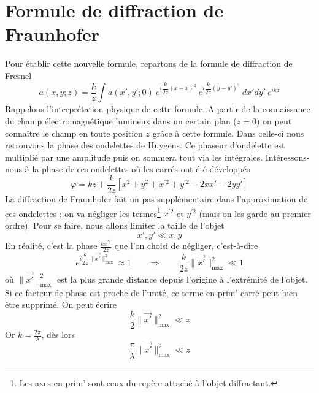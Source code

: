 \section{Formule de diffraction de Fraunhofer}
Pour établir cette nouvelle formule, repartons de la formule de diffraction de Fresnel
\begin{equation}
a(x,y;z) = \frac{k}{z}\int a(x',y';0)\ e^{i\dfrac{k}{2z}(x-x)^2}\
 e^{i\dfrac{k}{2z}(y-y')^2}\ dx'dy'\  e^{ikz}
\end{equation}
Rappelons l'interprétation physique de cette formule.
A partir de la connaissance du champ électromagnétique lumineux dans un certain plan 
($z=0$) on peut connaître le champ en toute position $z$ grâce à cette formule. Dans 
celle-ci nous retrouvons la phase des ondelettes de Huygens. Ce phaseur d'ondelette 
est multiplié par une amplitude puis on sommera tout via les intégrales. Intéressons-
nous à la phase de ces ondelettes où les carrés ont été développés
\begin{equation}
\varphi = kz + \frac{k}{2z}\left[x^2 + y^2 + x^{'2} + y^{'2} - 2xx'-2yy'\right]
\end{equation}
La diffraction de Fraunhofer fait un pas supplémentaire dans l'approximation de ces 
ondelettes : on va négliger les termes\footnote{Les axes en prim' sont ceux du repère 
attaché à l'objet diffractant.} $x^{'2}$ et $y^{'2}$ (mais on les garde au premier 
ordre). Pour se faire, nous allons limiter la taille de l'objet
\begin{equation}
x',y' \ll x,y
\end{equation}
En réalité, c'est la phase $\frac{kx^{'2}}{2z}$ que l'on choisi de négliger, c'est-à-dire
\begin{equation}
e^{i\dfrac{k}{2z}\|\vec{x'}\|^2_{\max}} \approx 1\qquad\Rightarrow\qquad \dfrac{k}{2z}\|
\vec{x'}\|^2_{\max}\ll 1
\end{equation}
où $\|\vec{x'}\|^2_{\max}$ est la plus grande distance depuis l'origine à l'extrémité 
de l'objet. Si ce facteur de phase est proche de l'unité, ce terme en prim' carré peut 
bien être supprimé. On peut écrire
\begin{equation}
\dfrac{k}{2}\|\vec{x'}\|^2_{\max} \ll z
\end{equation}
Or $k = \frac{2\pi}{\lambda}$, dès lors
\begin{equation}
\dfrac{\pi}{\lambda}\|\vec{x'}\|^2_{\max} \ll z
\end{equation}

